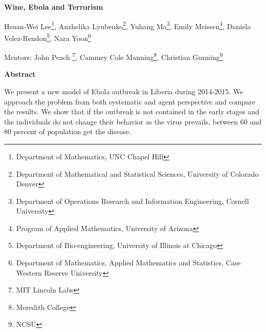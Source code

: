 \documentclass[10pt]{article}
\begin{document}
 

%
%
%
%
%
%
%
%
%

\centerline{\large \bf Wine, Ebola and Terrorism}

\vspace{.1truein}

\def\thefootnote{\arabic{footnote}}
\begin{center}
  Hsuan-Wei Lee\footnote{Department of Mathematics, UNC Chapel Hill},
  Anzhelika Lyubenko\footnote{Department of Mathematical and Statistical Sciences, University of Colorado Denver},
  Yuhang Ma\footnote{Department of Operations Research and Information Engineering, Cornell University},
  Emily Meissen\footnote{Program of Applied Mathematics, University of Arizona},
  Daniela Velez-Rendon\footnote{Department of Bio-engineering, University of Illinois at Chicago},
    Nara Yoon\footnote{
Department of Mathematics, Applied Mathematics and Statistics, Case Western Reserve University}
\end{center}


\begin{center}
Mentors: John Peach \footnote{MIT Lincoln Labs}, Cammey Cole Manning\footnote{Meredith College},
Christian Gunning\footnote{NCSU}
\end{center}
%
%
%
%
%
%
%
%
%

\vspace{.3truein}
\centerline{\bf Abstract}

We present a new model of Ebola outbreak in Liberia during 2014-2015. We approach the problem from both systematic and agent perspective and compare the results. We show that if the outbreak is not contained in the early stages and the individuals do not change their behavior as the virus prevails, between 60 and 80 percent of population get the disease. 

%
%
%
%
%
%
%
%
%
\end{document}
